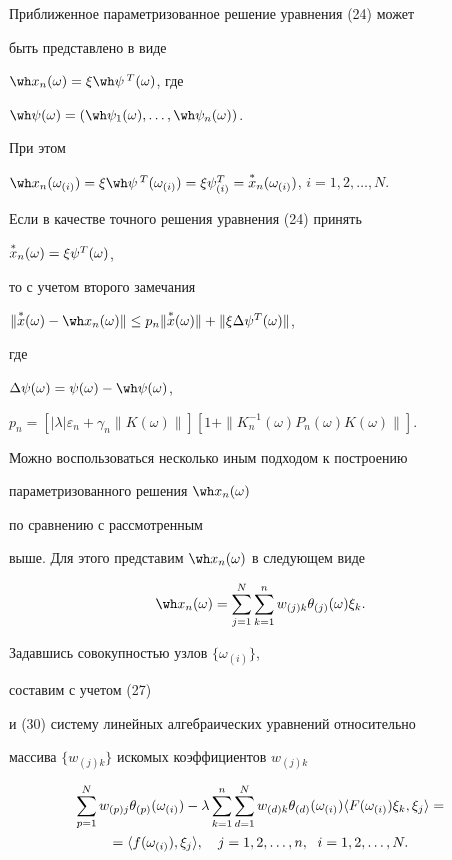 Приближенное параметризованное решение уравнения (24) может


быть представлено в виде


$\wh x_n(\omega)=\xi\wh\psi\,{}^T(\omega)$, где


$\wh\psi(\omega)=(\wh\psi_1(\omega),\dotsc,\wh\psi_n(\omega))$.


При этом


$\wh x_n(\omega_{(i)})=\xi\wh\psi\,{}^T(\omega_{(i)})=


\xi\psi^T_{(i)}=\up{*}{x}_n(\omega_{(i)})$, $i=1,2,\dotsc,N$.


Если в качестве точного решения уравнения (24) принять


$\overset{*}{x}{}_n(\omega)=\xi\psi^T(\omega)$,


то с учетом второго замечания


$\|\up{*}{x}(\omega)-\wh x_n(\omega)\|\le


p_n\|\up{*}{x}(\omega)\|+\|\xi\Delta\psi^T(\omega)\|$,


где


$\Delta\psi(\omega)=\psi(\omega)-\wh\psi(\omega)$,


$p_n=[|\lambda|\varepsilon_n+\gamma_n\|K(\omega)\|]


[1+\|K^{-1}_n(\omega)P_n(\omega)K(\omega)\|]$.





Можно воспользоваться несколько иным подходом к построению


параметризованного решения $\wh x_n(\omega)$


по сравнению с рассмотренным


выше. Для этого представим $\wh x_n(\omega)$ в следующем виде


\begin{equation}


\wh x_n(\omega)=\sum^N_{j=1}\sum^n_{k=1}


w_{(j)k}\theta_{(j)}(\omega)\xi_k.


\end{equation}


Задавшись совокупностью узлов $\{\omega_{(i)}\}$,


составим с учетом (27)


и (30) систему линейных алгебраических уравнений относительно


массива $\{w_{(j)k}\}$ искомых коэффициентов $w_{(j)k}$


\begin{multline}


\sum^N_{p=1}w_{(p)j}\theta_{(p)}(\omega_{(i)})-


\lambda\sum^n_{k=1}\sum^N_{d=1}w_{(d)k}\theta_{(d)}


(\omega_{(i)})\la F(\omega_{(i)})\xi_k,\xi_j\ra = \\


%


=\la f(\omega_{(i)}),\xi_j\ra,\quad j=1,2,\dotsc,n,\ \;


i=1,2,\dotsc,N.


\end{multline}


